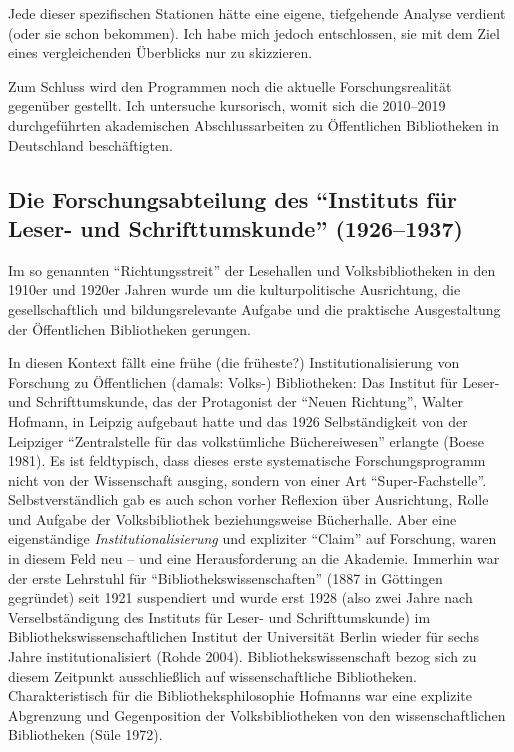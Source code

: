 \documentclass[a4paper,
fontsize=11pt,
oneside,
numbers=noperiodatend,
parskip=half-,
bibliography=totoc,
final
]{scrartcl}
\begin{document}
Jede dieser spezifischen Stationen hätte eine eigene, tiefgehende
Analyse verdient (oder sie schon bekommen). Ich habe mich jedoch
entschlossen, sie mit dem Ziel eines vergleichenden Überblicks nur zu
skizzieren.

Zum Schluss wird den Programmen noch die aktuelle Forschungsrealität
gegenüber gestellt. Ich untersuche kursorisch, womit sich die 2010--2019
durchgeführten akademischen Abschlussarbeiten zu Öffentlichen
Bibliotheken in Deutschland beschäftigten.

\hypertarget{die-forschungsabteilung-des-instituts-fuxfcr-leser--und-schrifttumskunde-19261937}{%
\subsection{\texorpdfstring{Die Forschungsabteilung des
\enquote{Instituts für Leser- und Schrifttumskunde}
(1926--1937)}{1. Die Forschungsabteilung des ``Instituts für Leser- und Schrifttumskunde'' (1926--1937)}}\label{die-forschungsabteilung-des-instituts-fuxfcr-leser--und-schrifttumskunde-19261937}}

Im so genannten \enquote{Richtungsstreit} der Lesehallen und
Volksbibliotheken in den 1910er und 1920er Jahren wurde um die
kulturpolitische Ausrichtung, die gesellschaftlich und bildungsrelevante
Aufgabe und die praktische Ausgestaltung der Öffentlichen Bibliotheken
gerungen.

In diesen Kontext fällt eine frühe (die früheste?) Institutionalisierung
von Forschung zu Öffentlichen (damals: Volks-) Bibliotheken: Das
Institut für Leser- und Schrifttumskunde, das der Protagonist der
\enquote{Neuen Richtung}, Walter Hofmann, in Leipzig aufgebaut hatte und
das 1926 Selbständigkeit von der Leipziger \enquote{Zentralstelle für
das volkstümliche Büchereiwesen} erlangte (Boese 1981). Es ist
feldtypisch, dass dieses erste systematische Forschungsprogramm nicht
von der Wissenschaft ausging, sondern von einer Art
\enquote{Super-Fachstelle}. Selbstverständlich gab es auch schon vorher
Reflexion über Ausrichtung, Rolle und Aufgabe der Volksbibliothek
beziehungsweise Bücherhalle. Aber eine eigenständige
\emph{Institutionalisierung} und expliziter \enquote{Claim} auf
Forschung, waren in diesem Feld neu -- und eine Herausforderung an die
Akademie. Immerhin war der erste Lehrstuhl für
\enquote{Bibliothekswissenschaften} (1887 in Göttingen gegründet) seit
1921 suspendiert und wurde erst 1928 (also zwei Jahre nach
Verselbständigung des Instituts für Leser- und Schrifttumskunde) im
Bibliothekswissenschaftlichen Institut der Universität Berlin wieder für
sechs Jahre institutionalisiert (Rohde 2004). Bibliothekswissenschaft
bezog sich zu diesem Zeitpunkt ausschließlich auf wissenschaftliche
Bibliotheken. Charakteristisch für die Bibliotheksphilosophie Hofmanns
war eine explizite Abgrenzung und Gegenposition der Volksbibliotheken
von den wissenschaftlichen Bibliotheken (Süle 1972).
\end{document}
